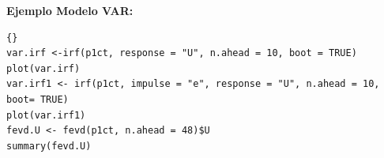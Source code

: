 %		
%		
%		
%
\textbf{Ejemplo Modelo VAR:}
\begin{lstlisting}[title={‘Código R: ejemplo Modelo VAR},basicstyle=\ttfamily]{}
var.irf <-irf(p1ct, response = "U", n.ahead = 10, boot = TRUE)
plot(var.irf)
var.irf1 <- irf(p1ct, impulse = "e", response = "U", n.ahead = 10, boot= TRUE)
plot(var.irf1)
fevd.U <- fevd(p1ct, n.ahead = 48)$U
summary(fevd.U)
\end{lstlisting}
